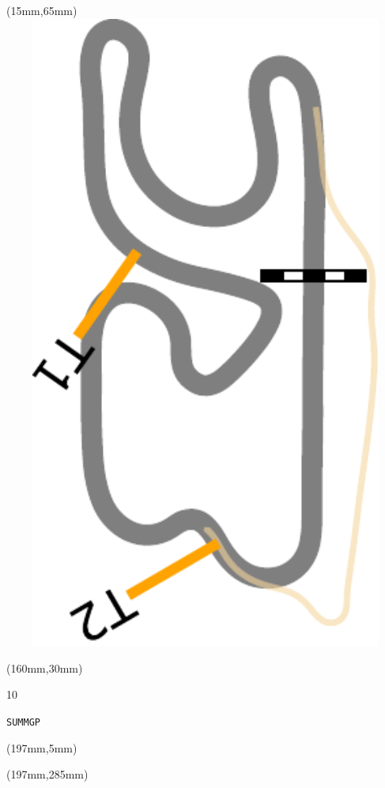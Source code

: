 \begin{textblock*}{185mm}(15mm,65mm)%
\centering
\mbox{\includegraphics[width=185mm,height=210mm,keepaspectratio]{PT/SUMMGP.pdf}}
\end{textblock*}
\begin{textblock*}{40mm}(160mm,30mm)%
\Large
\par{} 
\par10 
\par\hfill\tiny\tt SUMMGP\\
\end{textblock*}
\begin{textblock*}{20mm}(197mm,5mm)%
\fbox{\thepage}
\label{SUMMGP}
\end{textblock*}
\begin{textblock*}{20mm}(197mm,285mm)%
\fbox{\thepage}
\end{textblock*}

